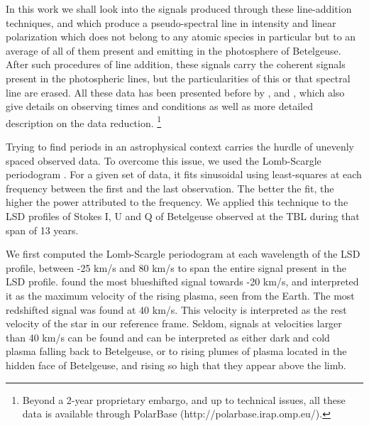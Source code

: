\documentclass{aa}
\begin{document}
In this work we shall look into the signals produced through these line-addition techniques, and which produce a pseudo-spectral line in intensity 
and linear polarization which does not belong to any atomic species in particular but to an average of all of them present and emitting in the 
photosphere of Betelgeuse. After such procedures of line addition, these signals carry the coherent signals present in the photospheric lines, but the particularities of this or 
that spectral line are erased. All these data has been presented before by \cite{auriere_discovery_2016}, \cite{mathias_evolution_2018} and 
\cite{lopez_ariste_three-dimensional_2022}, which also give details on observing times and conditions as well as more detailed description 
on the data reduction. \footnote[1]{Beyond a 2-year proprietary embargo, and up to technical issues, all these data is available through 
PolarBase (http://polarbase.irap.omp.eu/).}




Trying to find periods in an astrophysical context carries the hurdle of unevenly spaced observed data. To overcome this issue, 
we used the Lomb-Scargle periodogram \citep{lomb_least-squares_1976,scargle_studies_1982}. For a given set of data, it fits sinusoidal 
using least-squares at each frequency between the first and the last observation. The better the fit, the higher the power attributed to the frequency. 
We applied this technique to the  LSD profiles of Stokes I, U and Q of Betelgeuse observed at the TBL during 
that span of 13 years. 


We first computed the Lomb-Scargle periodogram at each wavelength of the LSD profile, between -25 km/s and 80 km/s to span the entire 
signal present in the LSD profile. \cite{lopez_ariste_convective_2018} found the most blueshifted signal towards -20 km/s, 
and interpreted it as  the maximum velocity of the rising plasma, seen from the Earth. The most redshifted signal was found at 40 km/s. 
This velocity is interpreted
as the rest velocity of the star in our reference frame. Seldom, signals at velocities larger than 40 km/s can be found 
and can be interpreted as either dark and cold plasma falling back to Betelgeuse, 
or to rising plumes of plasma located in the hidden face of Betelgeuse,
and rising so high that they appear above the limb.
\end{document}
